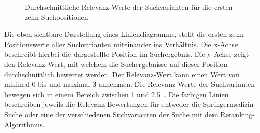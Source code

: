 
\begin{figure}[H]
\centering 
\vspace{-1em}
\caption[Durchschnittliche Relevanz-Werte der Suchvarianten für die ersten zehn Suchpositionen]{Durchschnittliche Relevanz-Werte der Suchvarianten für die ersten zehn Suchpositionen}
\label{fig:Evaluation:Auswertung:RelevanzVarianten}

\footnotesize
{}\rel
  

\vspace{-2em}
\end{figure}

Die oben sichtbare Darstellung eines Liniendiagramms, stellt die ersten zehn Positionswerte aller Suchvarianten miteinander ins Verhältnis. Die x-Achse beschreibt hierbei die dargestellte Position im Suchergebnis. Die y-Achse zeigt den Relevanz-Wert, mit welchem die Suchergebnisse auf dieser Position durchschnittlich bewertet werden. Der Relevanz-Wert kann einen Wert von minimal 0 bis und maximal 3 annehmen. Die Relevanz-Werte der Suchvarianten bewegen sich in einem Bereich zwischen 1 und 2.5~. Die farbigen Linien beschreiben jeweils die Relevanz-Bewertungen für entweder die Springermedizin-Suche oder eine der verschiedenen Suchvarianten der Suche mit dem Reranking-Algorithmus. 

